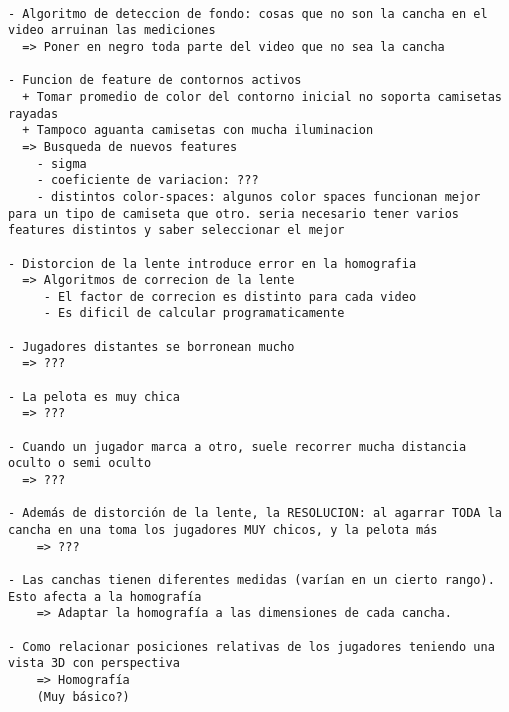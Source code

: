 \documentclass[a4paper,10pt]{article}
\begin{document}
\begin{verbatim}

- Algoritmo de deteccion de fondo: cosas que no son la cancha en el video arruinan las mediciones
  => Poner en negro toda parte del video que no sea la cancha

- Funcion de feature de contornos activos
  + Tomar promedio de color del contorno inicial no soporta camisetas rayadas
  + Tampoco aguanta camisetas con mucha iluminacion
  => Busqueda de nuevos features
    - sigma
    - coeficiente de variacion: ???
    - distintos color-spaces: algunos color spaces funcionan mejor para un tipo de camiseta que otro. seria necesario tener varios features distintos y saber seleccionar el mejor

- Distorcion de la lente introduce error en la homografia
  => Algoritmos de correcion de la lente
     - El factor de correcion es distinto para cada video
     - Es dificil de calcular programaticamente

- Jugadores distantes se borronean mucho
  => ???

- La pelota es muy chica
  => ???

- Cuando un jugador marca a otro, suele recorrer mucha distancia oculto o semi oculto
  => ???

- Además de distorción de la lente, la RESOLUCION: al agarrar TODA la cancha en una toma los jugadores MUY chicos, y la pelota más
    => ???

- Las canchas tienen diferentes medidas (varían en un cierto rango). Esto afecta a la homografía
    => Adaptar la homografía a las dimensiones de cada cancha.

- Como relacionar posiciones relativas de los jugadores teniendo una vista 3D con perspectiva
    => Homografía
    (Muy básico?)

\end{verbatim}
\end{document}
